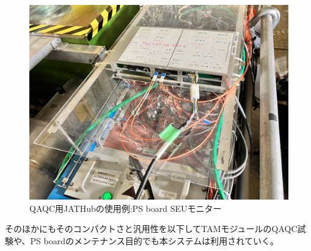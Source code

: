 \begin{figure} 
\centering
\includegraphics[width=16cm]{fig/JATHubSEU.JPG}
\caption[QAQC用JATHubの使用例:PS board SEUモニター]{QAQC用JATHubの使用例:PS board SEUモニター\cite{mt_hashimoto}}
\label{JATHubSEU}
\end{figure}

そのほかにもそのコンパクトさと汎用性を以下してTAMモジュールのQAQC試験や、PS boardのメンテナンス目的でも本システムは利用されていく。